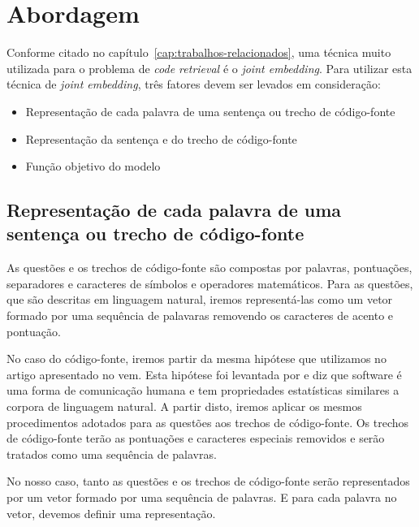 \chapter{Abordagem}
\label{cap:abordagem}


Conforme citado no capítulo~\ref{cap:trabalhos-relacionados}, uma técnica muito utilizada para o problema de \textit{code retrieval} é o \textit{joint embedding}. Para utilizar esta técnica de \textit{joint embedding}, três fatores devem ser levados em consideração:

\begin{itemize}
    \item Representação de cada palavra de uma sentença ou trecho de código-fonte
    \item Representação da sentença e do trecho de código-fonte
    \item Função objetivo do modelo
\end{itemize}

\section{Representação de cada palavra de uma sentença ou trecho de código-fonte}
\label{sec:abordagem-representacao-token}

As questões e os trechos de código-fonte são compostas por palavras, pontuações, separadores e caracteres de símbolos e operadores matemáticos. Para as questões, que são descritas em linguagem natural, iremos representá-las como um vetor formado por uma sequência de palavaras removendo os caracteres de acento e pontuação.

No caso do código-fonte, iremos partir da  mesma hipótese que utilizamos no artigo \cite{marcelo-vem-2019} apresentado no \acrfull{vem}. Esta hipótese foi levantada por \cite{Allamanis:2018:SML} e diz que software é uma forma de comunicação humana e tem propriedades estatísticas similares a corpora de linguagem natural. A partir disto, iremos aplicar os mesmos procedimentos adotados para as questões aos trechos de código-fonte. Os trechos de código-fonte terão as pontuações e caracteres especiais removidos e serão tratados como uma sequência de palavras.

No nosso caso, tanto as questões e os trechos de código-fonte serão representados por um vetor formado por uma sequência de palavras. E para cada palavra no vetor, devemos definir uma representação.

